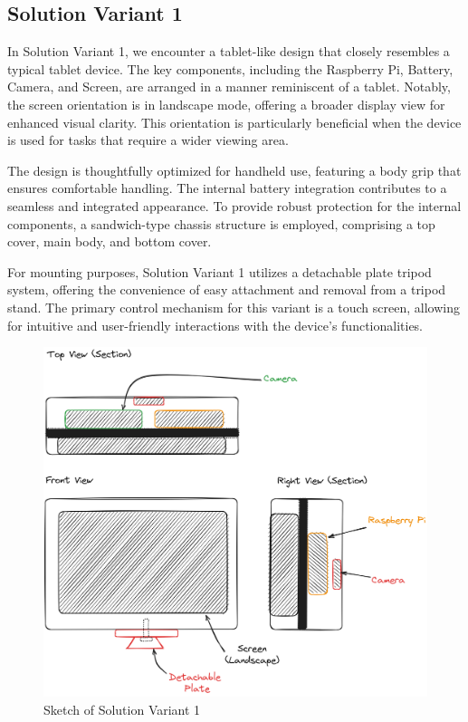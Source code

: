 \subsection{Solution Variant 1}
In Solution Variant 1, we encounter a tablet-like design that closely resembles a typical tablet device. The key components, including the Raspberry Pi, Battery, Camera, and Screen, are arranged in a manner reminiscent of a tablet. Notably, the screen orientation is in landscape mode, offering a broader display view for enhanced visual clarity. This orientation is particularly beneficial when the device is used for tasks that require a wider viewing area.

The design is thoughtfully optimized for handheld use, featuring a body grip that ensures comfortable handling. The internal battery integration contributes to a seamless and integrated appearance. To provide robust protection for the internal components, a sandwich-type chassis structure is employed, comprising a top cover, main body, and bottom cover.

For mounting purposes, Solution Variant 1 utilizes a detachable plate tripod system, offering the convenience of easy attachment and removal from a tripod stand. The primary control mechanism for this variant is a touch screen, allowing for intuitive and user-friendly interactions with the device's functionalities.

\begin{figure}[H]
    \centering
    \includegraphics[width=\linewidth]{texs/Part1/chapter3/image/v1.png}
    \caption{Sketch of Solution Variant 1}
    \label{fig:sketch-solution-variant-1}
\end{figure}


